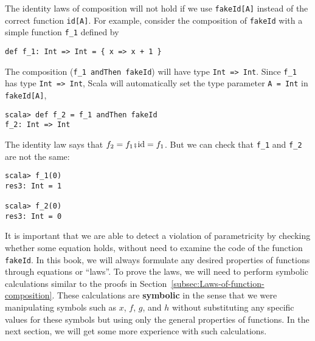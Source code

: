 The identity laws of composition will not hold if we use \lstinline!fakeId[A]!
instead of the correct function \lstinline!id[A]!.
For example, consider the composition of \lstinline!fakeId!
with a simple function \lstinline!f_1!
defined by
\begin{lstlisting}
def f_1: Int => Int = { x => x + 1 }
\end{lstlisting}
The composition (\lstinline!f_1 andThen fakeId!)
will have type \lstinline!Int => Int!.
Since \lstinline!f_1! has
type \lstinline!Int => Int!,
Scala will automatically set the type parameter \lstinline!A = Int!
in \lstinline!fakeId[A]!,
\begin{lstlisting}
scala> def f_2 = f_1 andThen fakeId
f_2: Int => Int
\end{lstlisting}
The identity law says that $f_{2}=f_{1}\bef\text{id}=f_{1}$. But
we can check that \lstinline!f_1!
and \lstinline!f_2! are
not the same:
\begin{lstlisting}
scala> f_1(0)
res3: Int = 1

scala> f_2(0)
res3: Int = 0
\end{lstlisting}
It is important that we are able to detect a violation of parametricity
by checking whether some equation holds, without need to examine the
code of the function \lstinline!fakeId!.
In this book, we will always formulate any desired properties of functions
through equations or ``laws''. To prove the laws, we will need to
perform symbolic calculations similar
to the proofs in Section~\ref{subsec:Laws-of-function-composition}.
These calculations are \textbf{symbolic} in the sense that we were
manipulating symbols such as $x$, $f$, $g$, and $h$ without substituting
any specific values for these symbols but using only the general properties
of functions. In the next section, we will get some more experience
with such calculations.

